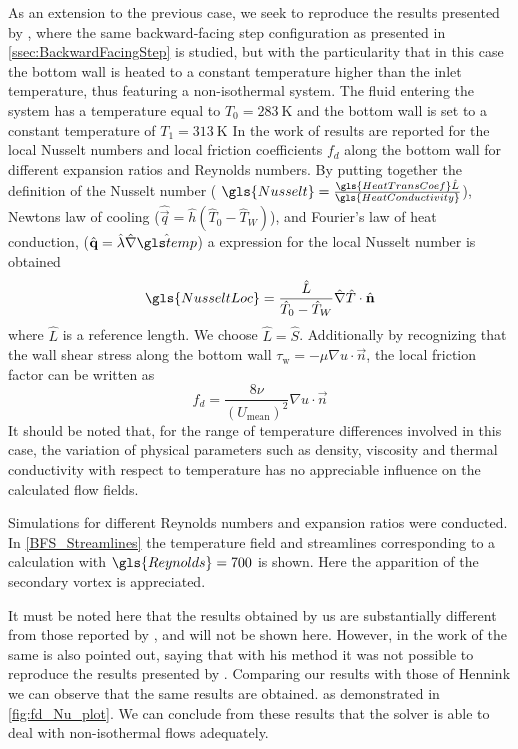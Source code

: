 As an extension to the previous case, we seek to reproduce the results presented by \cite{xieFluidFlowHeat2016}, where the same backward-facing step configuration as presented in \cref{ssec:BackwardFacingStep} is studied, but with the particularity that in this case the bottom wall is heated to a constant temperature higher than the inlet temperature, thus featuring a non-isothermal system. The fluid entering the system has a temperature equal to $T_0 = \SI{283}{\kelvin}$ and the bottom wall is set to a constant temperature of $T_1 =\SI{313}{\kelvin}$
In the work of \cite{xieFluidFlowHeat2016} results are reported for the local Nusselt numbers and local friction coefficients $f_d$  along the bottom wall for different expansion ratios and Reynolds numbers. By putting together the definition of the Nusselt number ( $\gls{Nusselt} = \frac{\gls{HeatTransCoef}\hat{L}}{\gls{HeatConductivity}}$), Newtons law of cooling ($\hat{\vec{q}} = \hat{h} (\hat{T}_0 - \hat{T}_W )$), and Fourier's law of heat  conduction, ($\hat{\vec{q}} = \hat \lambda \hat{\nabla} \glsHat{temp}$) a expression for the local Nusselt number is obtained
\begin{equation}
	\gls{NusseltLoc} = \frac{\hat L}{\hat T_0-\hat T_W}\hat \nabla \hat T \cdot \hat {\vec{n}}
\end{equation}
where $\hat L$ is a reference length. We choose $ \hat L = \hat S$. Additionally by recognizing that the wall shear stress along the bottom wall $\tau_{\text{w}} = -\mu \nabla u \cdot \vec{n}$, the local friction factor can be written as
\begin{equation}
	f_d = \frac{8\nu} { (U_{\text{mean}})^2}  \nabla u \cdot \vec{n}
\end{equation}
It should be noted that, for the range of temperature differences involved in this case, the variation of physical parameters such as density, viscosity and thermal conductivity with respect to temperature has no appreciable influence on the calculated flow fields.

Simulations for different Reynolds numbers and expansion ratios were conducted. In \cref{BFS_Streamlines} the temperature field and streamlines corresponding to a calculation with $\gls{Reynolds} = 700$ is shown. Here the apparition of the secondary vortex is appreciated.

It must be noted here that the results obtained by us are substantially different from those reported by \cite{xieFluidFlowHeat2016}, and will not be shown here. However, in the work of \cite{henninkLowMachNumberFlow2022} the same is also pointed out, saying that with his method it was not possible to reproduce the results presented by \cite{xieFluidFlowHeat2016}. Comparing our results with those of Hennink we can observe that the same results are obtained. as demonstrated in \cref{fig:fd_Nu_plot}. We can conclude from these results that the solver is able to deal with non-isothermal flows adequately.

